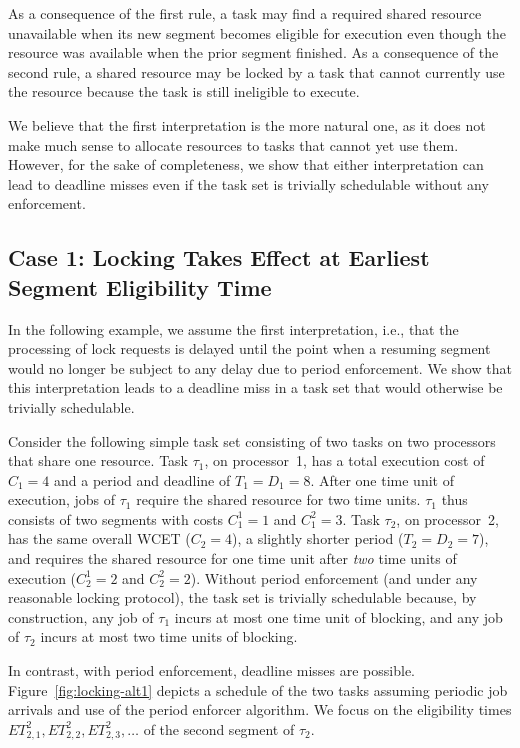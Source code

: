 As a consequence of the first rule, a task may find a required shared resource unavailable when its new segment becomes eligible for execution even though the resource was available when the prior segment finished.  As a consequence of the second rule, a shared resource may be locked by a task that cannot currently use the resource  because the task is still ineligible to execute.

We believe that the first interpretation is the more natural one, as it does not make much sense to allocate resources to tasks that cannot yet use them. However, for the sake of completeness, we show that either interpretation can lead to deadline misses even if the task set is trivially schedulable without any enforcement.

\subsection{Case 1: Locking Takes Effect at Earliest Segment Eligibility Time}
\label{sec:sem-case-1}
In the following example, we assume the first interpretation, i.e., that the processing of lock requests is delayed until the point when a resuming segment would no longer be subject to any delay due to period enforcement. We show that this interpretation leads to a deadline miss in a task set that would otherwise be trivially schedulable.

Consider the following simple task set consisting of two tasks on two processors that share one resource. Task $\tau_1$, on processor~1, has a total execution cost of $C_1 = 4$ and a period and deadline of $T_1 = D_1 = 8$. After one time unit of execution, jobs of $\tau_1$ require the shared resource for two time units. $\tau_1$ thus consists of two segments with costs $C_1^1 = 1$ and $C_1^2 = 3$. Task $\tau_2$, on processor~2, has the same overall WCET ($C_2 = 4$), a slightly shorter period ($T_2 = D_2 = 7$), and requires the shared resource for one time unit after \emph{two} time units of execution ($C_2^1 = 2$ and $C_2^2 = 2$). Without period enforcement (and under any reasonable locking protocol), the task set is trivially schedulable because, by construction, any job of $\tau_1$ incurs at most one time unit of blocking, and any job of $\tau_2$ incurs at most two time units of blocking.

In contrast, with period enforcement, deadline misses are possible.
Figure~\ref{fig:locking-alt1} depicts a schedule of the two tasks assuming periodic job arrivals and use of the period enforcer algorithm. We focus on the eligibility times $ET_{2,1}^2,ET_{2,2}^2,ET_{2,3}^2,\ldots$ of the second segment of $\tau_2$.

